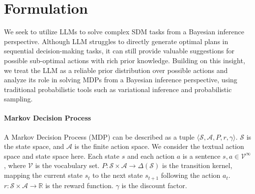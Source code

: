 \documentclass{article} %
\theoremstyle{plain}
\theoremstyle{definition}
\theoremstyle{remark}
\begin{document}
\section{Formulation}
\label{sec: method}
{
We seek to utilize LLMs to solve complex SDM tasks from a Bayesian inference perspective. Although LLM struggles to directly generate optimal plans in sequential decision-making tasks, it can still provide valuable suggestions for possible sub-optimal actions with rich prior knowledge\cite{hao2023reasoning,zhang2024can}. Building on this insight, we treat the LLM as a reliable prior distribution over possible actions and analyze its role in solving MDPs from a Bayesian inference perspective, using traditional probabilistic tools such as variational inference and probabilistic sampling.

}
\paragraph{Markov Decision Process}
A Markov Decision Process (MDP) can be described as a tuple $\langle\mathcal{S},\mathcal{A},P,r,\gamma\rangle$. $\mathcal{S}$ is the state space, and $\mathcal{A}$ is the finite action space. We consider the textual action space and state space here. Each state $s$ and each action $a$ is a sentence $s,a\in \mathcal{V}^\infty$, where $\mathcal{V}$ is the vocabulary set. $P:\mathcal{S}\times\mathcal{A}\rightarrow \Delta(\mathcal{S})$ is the transition kernel, mapping the current state $s_t$ to the next state $s_{t+1}$ following the action $a_t$. $r:\mathcal{S}\times\mathcal{A}\rightarrow \mathbb{R}$ is the reward function. $\gamma$ is the discount factor.
\end{document}
